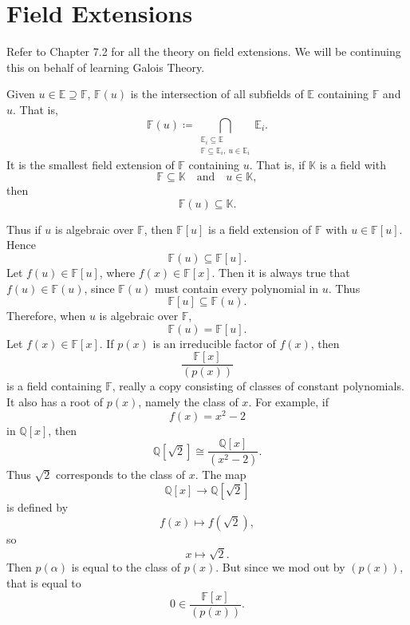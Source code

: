 
\section{Field Extensions}

Refer to Chapter 7.2 for all the theory on field extensions.
We will be continuing this on behalf of learning Galois Theory.

\begin{definition}
    Given $u\in\mathbb{E}\supseteq \mathbb{F}$, $\mathbb{F}(u)$ is the intersection of all subfields of $\mathbb{E}$ containing $\mathbb{F}$ and $u$.
    That is,
    \[
        \mathbb{F}(u)
        \coloneqq
        \bigcap_{\substack{\mathbb{E}_i\subseteq \mathbb{E}\\ \mathbb{F}\subseteq \mathbb{E}_i,\ u\in \mathbb{E}_i}} \mathbb{E}_i.
    \]
    It is the smallest field extension of $\mathbb{F}$ containing $u$.
    That is, if $\mathbb{K}$ is a field with
    \[
        \mathbb{F}\subseteq \mathbb{K}
        \quad\text{and}\quad
        u\in \mathbb{K},
    \]
    then
    \[
        \mathbb{F}(u)\subseteq \mathbb{K}.
    \]
\end{definition}

Thus if $u$ is algebraic over $\mathbb{F}$, then $\mathbb{F}[u]$ is a field extension of $\mathbb{F}$ with $u\in \mathbb{F}[u]$.
Hence
\[
    \mathbb{F}(u)\subseteq \mathbb{F}[u].
\]
Let $f(u)\in \mathbb{F}[u]$, where $f(x)\in \mathbb{F}[x]$.
Then it is always true that $f(u)\in \mathbb{F}(u)$, since $\mathbb{F}(u)$ must contain every polynomial in $u$.
Thus
\[
    \mathbb{F}[u]\subseteq \mathbb{F}(u).
\]
Therefore, when $u$ is algebraic over $\mathbb{F}$,
\[
    \mathbb{F}(u)=\mathbb{F}[u].
\]
Let $f(x)\in \mathbb{F}[x]$.
If $p(x)$ is an irreducible factor of $f(x)$, then
\[
    \frac{\mathbb{F}[x]}{(p(x))}
\]
is a field containing $\mathbb{F}$, really a copy consisting of classes of constant polynomials.
It also has a root of $p(x)$, namely the class of $x$.
For example, if
\[
    f(x)=x^2-2
\]
in $\mathbb{Q}[x]$, then
\[
    \mathbb{Q}\left[\sqrt{2}\right] \cong \frac{\mathbb{Q}[x]}{(x^2-2)}.
\]
Thus $\sqrt{2}$ corresponds to the class of $x$.
The map
\[
    \mathbb{Q}[x]\to \mathbb{Q}\left[\sqrt{2}\right]
\]
is defined by
\[
    f(x)\mapsto f\left(\sqrt{2}\right),
\]
so
\[
    x\mapsto \sqrt{2}.
\]
Then $p(\alpha)$ is equal to the class of $p(x)$.
But since we mod out by $(p(x))$, that is equal to
\[
    0\in \frac{\mathbb{F}[x]}{(p(x))}.
\]


